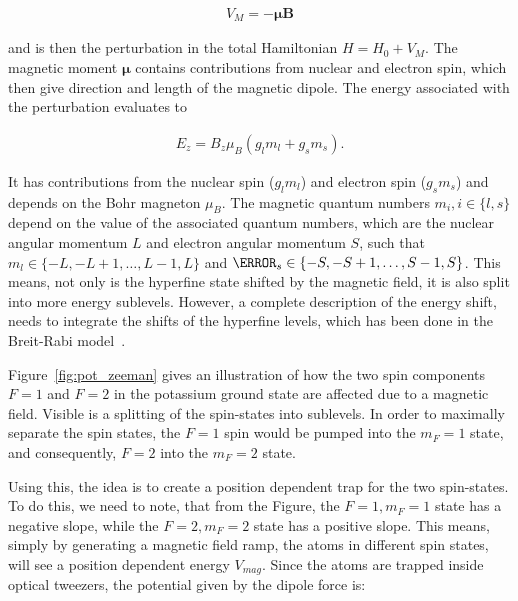 \begin{align}
	V_M = - \bm{\mu} \bm{B}
\end{align}

and is then the perturbation in the total Hamiltonian $H = H_0 + V_M$. The magnetic moment $\bm{\mu}$ contains contributions from nuclear and electron spin, which then give direction and length of the magnetic dipole. The energy associated with the perturbation evaluates to

\begin{align}
	E_z = B_z \mu_B \left(g_l m_l + g_s m_s\right).
\end{align}

It has contributions from the nuclear spin ($g_l m_l$) and electron spin ($g_s m_s$) and depends on the Bohr magneton $\mu_B$. The magnetic quantum numbers $m_i, i\in\{l,s\}$ depend on the value of the associated quantum numbers, which are the nuclear angular momentum $L$ and electron angular momentum $S$, such that $m_l \in \{-L, -L+1, \ldots, L-1, L\}$ and $\m_s \in \{-S, -S+1, \ldots, S-1, S\}$. This means, not only is the hyperfine state shifted by the magnetic field, it is also split into more energy sublevels. However, a complete description of the energy shift, needs to integrate the shifts of the hyperfine levels, which has been done in the Breit-Rabi model~\cite{Breit1931}.

Figure~\ref{fig:pot_zeeman} gives an illustration of how the two spin components $F=1$ and $F=2$ in the potassium ground state are affected due to a magnetic field. Visible is a splitting of the spin-states into sublevels. In order to maximally separate the spin states, the $F=1$ spin would be pumped into the $m_F=1$ state, and consequently, $F=2$ into the $m_F=2$ state.


Using this, the idea is to create a position dependent trap for the two spin-states. To do this, we need to note, that from the Figure, the $F=1, m_F=1$ state has a negative slope, while the $F=2, m_F=2$ state has a positive slope. This means, simply by generating a magnetic field ramp, the atoms in different spin states, will see a position dependent energy $V_{mag}$. Since the atoms are trapped inside optical tweezers, the potential given by the dipole force is:

